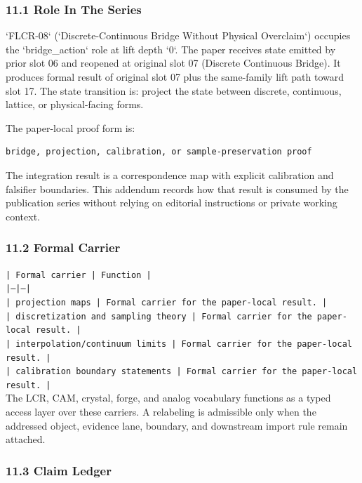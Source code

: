 \documentclass[11pt]{article}
\begin{document}
\subsubsection*{11.1 Role In The Series}

`FLCR-08` (`Discrete-Continuous Bridge Without Physical Overclaim`) occupies the `bridge\_action` role at lift depth `0`.
The paper receives state emitted by prior slot 06 and reopened at original slot 07 (Discrete Continuous Bridge). It produces formal result of original slot 07 plus the same-family lift path toward slot 17. The state transition is:
project the state between discrete, continuous, lattice, or physical-facing forms.

The paper-local proof form is:

\begin{verbatim}
bridge, projection, calibration, or sample-preservation proof
\end{verbatim}

The integration result is a correspondence map with explicit calibration and falsifier boundaries. This addendum records how that result is
consumed by the publication series without relying on editorial instructions or
private working context.

\subsubsection*{11.2 Formal Carrier}

\noindent\texttt{| Formal carrier | Function |}\\
\noindent\texttt{|---|---|}\\
\noindent\texttt{| projection maps | Formal carrier for the paper-local result. |}\\
\noindent\texttt{| discretization and sampling theory | Formal carrier for the paper-local result. |}\\
\noindent\texttt{| interpolation/continuum limits | Formal carrier for the paper-local result. |}\\
\noindent\texttt{| calibration boundary statements | Formal carrier for the paper-local result. |}\\

The LCR, CAM, crystal, forge, and analog vocabulary functions as a typed access
layer over these carriers. A relabeling is admissible only when the addressed
object, evidence lane, boundary, and downstream import rule remain attached.

\subsubsection*{11.3 Claim Ledger}
\end{document}
